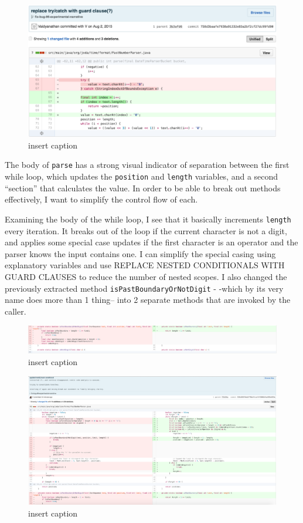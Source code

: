 \begin{figure}[H]
	\centering
	\includegraphics[width=\linewidth]{code13}
	\caption{insert caption}
\end{figure}


The body of \texttt{parse} has a strong visual indicator of separation between the first while loop, which updates the \texttt{position} and \texttt{length} variables, and a second “section” that calculates the value. In order to be able to break out methods effectively, I want to simplify the control flow of each.

Examining the body of the while loop, I see that it basically increments \texttt{length} every iteration. It breaks out of the loop if the current character is not a digit, and applies some special case updates if the first character is an operator and the parser knows the input contains one. I can simplify the special casing using explanatory variables and use REPLACE NESTED CONDITIONALS WITH GUARD CLAUSES to reduce the number of nested scopes. I also changed the previously extracted method \texttt{isPastBoundaryOrNotDigit} - -which by its very name does more than 1 thing-- into 2 separate methods that are invoked by the caller.

\begin{figure}[H]
	\centering
	\includegraphics[width=\linewidth]{code14}
	\caption{insert caption}
\end{figure}
\begin{figure}[H]
	\centering
	\includegraphics[width=\linewidth]{code15}
	\caption{insert caption}
\end{figure}

